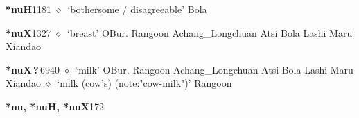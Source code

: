   \begin{list}{}{\leftmargin=1.5em \itemindent=-1.5em}
  \item {\footnotesize \textbf{*nuH}}{\tiny 1181}
         $\diamond$~`bothersome / disagreeable'
         Bola 
  \item {\footnotesize \textbf{*nuX}}{\tiny 1327}
\hspace{1ex}
         $\diamond$~`breast'
         OBur. 
\hspace{1ex}
         Rangoon 
\hspace{1ex}
         Achang\_Longchuan 
\hspace{1ex}
         Atsi 
\hspace{1ex}
         Bola 
\hspace{1ex}
         Lashi 
\hspace{1ex}
         Maru 
\hspace{1ex}
         Xiandao 
  \item {\footnotesize \textbf{*nuX\,?\,}}{\tiny 6940}
\hspace{1ex}
         $\diamond$~`milk'
         OBur. 
\hspace{1ex}
         Rangoon 
\hspace{1ex}
         Achang\_Longchuan 
\hspace{1ex}
         Atsi 
\hspace{1ex}
         Bola 
\hspace{1ex}
         Lashi 
\hspace{1ex}
         Maru 
\hspace{1ex}
         Xiandao 
\hspace{1ex}
         $\diamond$~`milk (cow's) (note:"cow-milk")'
         Rangoon 
  \item {\footnotesize \textbf{*nu, *nuH, *nuX}}{\tiny 172}
\hspace{1ex}

\end{list}
